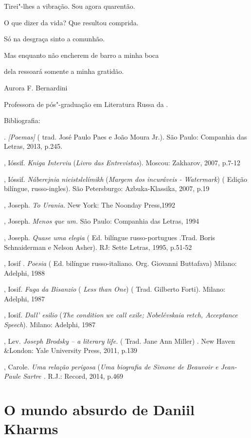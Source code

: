 Tirei"-lhes a vibração. Sou agora quarentão.

O que dizer da vida? Que resultou comprida.

Só na desgraça sinto a comunhão.

Mas enquanto não encherem de barro a minha boca

dela ressoará somente a minha gratidão.

Aurora F. Bernardini

Professora de pós"-graduação em Literatura Russa da .

Bibliografia:

. \emph{ [Poemas]} ( trad. José Paulo Paes e
João Moura Jr.). São Paulo: Companhia das Letras, 2013, p.245.

, Ióssif. \emph{Kniga Interviu} (\emph{Livro das Entrevistas}).
Moscou: Zakharov, 2007, p.7-12

, Ióssif. \emph{Náberejnia nieistslelímikh} (\emph{Margem dos
incuráveis - Watermark}) ( Edição bilíngue, russo-ingles). São
Petersburgo: Azbuka-Klassika, 2007, p.19

, Joseph. \emph{To Urania.} New York: The Noonday Press,1992

, Joseph. \emph{Menos que um.} São Paulo: Companhia das Letras,
1994

, Joseph. \emph{Quase uma elegia} ( Ed. bilíngue russo-portugues
.Trad. Boris Schnaiderman e Nelson Asher). RJ: Sette Letras, 1995,
p.51-52

, Iosif . \emph{Poesia} ( Ed. bilíngue russo-italiano. Org.
Giovanni Buttafava) Milano: Adelphi, 1988

, Iosif. \emph{Fuga da Bisanzio} ( \emph{Less than One}) ( Trad.
Gilberto Forti). Milano: Adelphi, 1987

, Iosif. \emph{Dall' esilio} (\emph{The condition we call exile;
Nobelévskaia retch, Acceptance Speech}). Milano: Adelphi, 1987

, Lev. \emph{Joseph Brodsky -- a literary life.} ( Trad. Jane Ann
Miller) . New Haven \&London: Yale University Press, 2011, p.139

, Carole. \emph{Uma relação perigosa} (\emph{Uma biografia
de Simone de Beauvoir e Jean-Paule Sartre .} R.J.: Record, 2014, p.469

\chapter{O mundo absurdo de Daniil Kharms}

